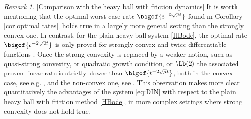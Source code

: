 \documentclass[reqno]{amsart}
\theoremstyle{plain}
\theoremstyle{definition}
\theoremstyle{remark}
\newtheorem{remark}{Remark}	%
\newcommand{\R}{\mathbb{R}}	%
\newcommand{\Gb}{\mathcal{G}}
\newcommand{\Qb}{\mathcal{Q}}
\begin{document}
\begin{remark}\label{remark comparison hb}[Comparison with the heavy ball with friction dynamics]
	It is worth mentioning that the optimal worst-case rate $\bigof{e^{-2\sqrt{\mu}t}}$ found in Corollary \ref{cor optimal rates}, holds true in a largely more general setting than the strongly convex one.  In contrast, for the plain heavy ball system \eqref{HBode}, the optimal rate $\bigof{e^{-2\sqrt{\mu}t}}$ is only proved for strongly convex and twice differentiable functions \cite[Theorem $9$]{polyak1964some}. Once the strong convexity is replaced by a weaker notion, such as quasi-strong convexity, or quadratic growth condition, or $\Lb(2)$ the associated proven linear rate is strictly slower than $\bigof{t^{-2\sqrt{\mu}t}}$, both in the convex case, see e.g. \cite[Theorem $1$]{aujol2022convergencequasi},  \cite[Corollary $1$]{aujol2023convergencePL} and the non-convex one, see \cite[Theorem $1$]{apidopoulos2022convergence}.
	This observation makes more clear quantitatively the advantages of the system \eqref{eq:DIN} with respect to the plain heavy ball with friction method \eqref{HBode}, in more complex settings where strong convexity does not hold true.
\end{remark}


\end{document}
